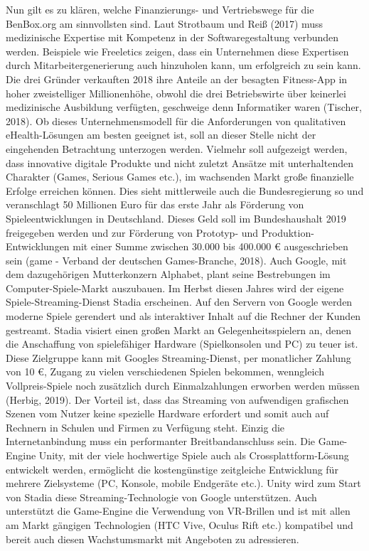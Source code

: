 \documentclass[
  a4paper,
  DIV=11,
  numbers=noendperiod,
  onecolumn,
  oneside,
  a4paper]{scrartcl}
\begin{document}
Nun gilt es zu klären, welche Finanzierungs- und Vertriebswege für die
BenBox.org am sinnvollsten sind. Laut Strotbaum und Reiß (2017) muss
medizinische Expertise mit Kompetenz in der Softwaregestaltung verbunden
werden. Beispiele wie Freeletics zeigen, dass ein Unternehmen diese
Expertisen durch Mitarbeitergenerierung auch hinzuholen kann, um
erfolgreich zu sein kann. Die drei Gründer verkauften 2018 ihre Anteile
an der besagten Fitness-App in hoher zweistelliger Millionenhöhe, obwohl
die drei Betriebswirte über keinerlei medizinische Ausbildung verfügten,
geschweige denn Informatiker waren (Tischer, 2018). Ob dieses
Unternehmensmodell für die Anforderungen von qualitativen
eHealth-Lösungen am besten geeignet ist, soll an dieser Stelle nicht der
eingehenden Betrachtung unterzogen werden. Vielmehr soll aufgezeigt
werden, dass innovative digitale Produkte und nicht zuletzt Ansätze mit
unterhaltenden Charakter (Games, Serious Games etc.), im wachsenden
Markt große finanzielle Erfolge erreichen können. Dies sieht
mittlerweile auch die Bundesregierung so und veranschlagt 50 Millionen
Euro für das erste Jahr als Förderung von Spieleentwicklungen in
Deutschland. Dieses Geld soll im Bundeshaushalt 2019 freigegeben werden
und zur Förderung von Prototyp- und Produktion-Entwicklungen mit einer
Summe zwischen 30.000 bis 400.000 € ausgeschrieben sein (game - Verband
der deutschen Games-Branche, 2018). Auch Google, mit dem dazugehörigen
Mutterkonzern Alphabet, plant seine Bestrebungen im
Computer-Spiele-Markt auszubauen. Im Herbst diesen Jahres wird der
eigene Spiele-Streaming-Dienst Stadia erscheinen. Auf den Servern von
Google werden moderne Spiele gerendert und als interaktiver Inhalt auf
die Rechner der Kunden gestreamt. Stadia visiert einen großen Markt an
Gelegenheitsspielern an, denen die Anschaffung von spielefähiger
Hardware (Spielkonsolen und PC) zu teuer ist. Diese Zielgruppe kann mit
Googles Streaming-Dienst, per monatlicher Zahlung von 10 €, Zugang zu
vielen verschiedenen Spielen bekommen, wenngleich Vollpreis-Spiele noch
zusätzlich durch Einmalzahlungen erworben werden müssen (Herbig, 2019).
Der Vorteil ist, dass das Streaming von aufwendigen grafischen Szenen
vom Nutzer keine spezielle Hardware erfordert und somit auch auf
Rechnern in Schulen und Firmen zu Verfügung steht. Einzig die
Internetanbindung muss ein performanter Breitbandanschluss sein. Die
Game-Engine Unity, mit der viele hochwertige Spiele auch als
Crossplattform-Lösung entwickelt werden, ermöglicht die kostengünstige
zeitgleiche Entwicklung für mehrere Zielsysteme (PC, Konsole, mobile
Endgeräte etc.). Unity wird zum Start von Stadia diese
Streaming-Technologie von Google unterstützen. Auch unterstützt die
Game-Engine die Verwendung von VR-Brillen und ist mit allen am Markt
gängigen Technologien (HTC Vive, Oculus Rift etc.) kompatibel und bereit
auch diesen Wachstumsmarkt mit Angeboten zu adressieren.
\end{document}

